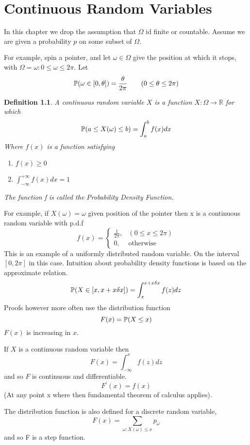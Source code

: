 \documentclass{notes}
\theoremstyle{plain}
\newtheorem{definition}{Definition}[chapter]
\newcommand{\bP}{\mathbb{P}}
\newcommand{\bR}{\mathbb{R}}
\newcommand{\prob}[1]{\bP \negthinspace\left(#1\right)}
\begin{document}
\chapter{Continuous Random Variables}
In this chapter we drop the assumption that $\Omega$ id finite or
countable. Assume we are given a probability $p$ on some subset of 
$\Omega$.

For example, spin a pointer, and let $\omega \in \Omega$ give the
position at which it stops, with 
$\Omega = {\omega:0\leq\omega\leq  2\pi}$. Let
\[
\prob{\omega \in[0,\theta]} = \frac{\theta}{2\pi} \qquad (0\le \theta\le2\pi)
\]
\begin{definition}
A continuous random variable $X$ is a function $X:\Omega \to \bR$ for
which 
\[
\prob{a\leq X(\omega)\leq b} = \int_a^b f(x)dx
\]
Where $f(x)$ is a function satisfying
\begin{enumerate}
\item $f(x) \geq 0$
\item $\int_{-\infty}^{+\infty} f(x)dx=1$
\end{enumerate}
The function f is called the \emph{Probability Density
  Function}.
\end{definition}
For example, if $X(\omega) = \omega$ given position of the pointer
then x is a continuous random variable with p.d.f
\begin{equation}
f(x)=
\begin{cases}
\frac{1}{2\pi}, & (0\le x\le 2\pi)\\
0, &\text{otherwise}
\end{cases}
\end{equation}
\vspace{2in}
This is an example of a uniformly distributed random variable. On the
interval $[0,2\pi]$ in this case. Intuition about probability density functions
 is based on the approximate relation.
\[
\prob{X\in[x,x+x\delta x]} = \int_x^{x+x\delta x} f(z)dz
\]
Proofs however more often use the distribution function
\[
F(x) = \prob{X \leq x}
\]
$F(x)$ is increasing in $x$.

\vspace{2in}

If $X$ is a continuous random variable then
\[
F(x) = \int_{-\infty}^x f(z) dz
\]
and so $F$ is continuous and differentiable.
\[
F^{'}(x) = f(x)
\]
(At any point x where then fundamental theorem of calculus
applies).

The distribution function is also defined for a discrete random
variable,
\[
F(x) = \sum_{\omega:X(\omega) \leq x} p_{\omega}
\]
and so F is a step function.
\end{document}
